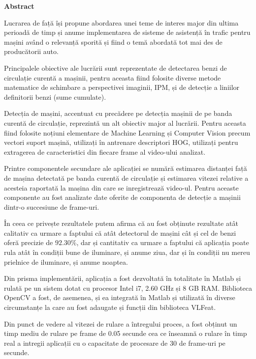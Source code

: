 \thispagestyle{plain}

\begin{center}
	\Large \textbf{Abstract}	
\end{center}

Lucrarea de față își propune abordarea unei teme de interes major din ultima perioadă de timp și anume implementarea de sisteme de asistență în trafic pentru mașini având o relevanță sporită și fiind o temă abordată tot mai des de producătorii auto. 

Principalele obiective ale lucrării sunt reprezentate de detectarea benzi de circulație curentă a mașinii, pentru aceasta fiind folosite diverse metode matematice de schimbare a perspectivei imaginii, IPM, și de detecție a liniilor definitorii benzi (sume cumulate).

Detecția de mașini, accentuat cu precădere pe detecția mașinii de pe banda curentă de circulație, reprezintă un alt obiectiv major al lucrării. Pentru aceasta fiind folosite noțiuni elementare de Machine Learning și Computer Vision precum vectori suport mașină, utilizați în antrenare descriptori HOG, utilizați pentru extragerea de caracteristici din fiecare frame al video-ului analizat.

Printre componentele secundare ale aplicației se numără estimarea distanței față de mașina detectată pe banda curentă de circulație și estimarea vitezei relative a acesteia raportată la mașina din care se inregistrează video-ul. Pentru aceaste componente au fost analizate date oferite de componenta de detecție a mașinii dintr-o succesiune de frame-uri.

În ceea ce privește rezultatele putem afirma că au fost obținute rezultate atât calitativ ca urmare a faptului că atât detectorul de mașini cât și cel de benzi oferă precizie de $92.30\%$, dar și cantitativ ca urmare a faptului că aplicația poate rula atât în condiții bune de iluminare, și anume ziua, dar și în condiții nu mereu prielnice de iluminare, și anume noaptea.

Din prisma implementării, aplicația a fost dezvoltată în totalitate în Matlab și rulată pe un sistem dotat cu procesor Intel i7, 2.60 GHz și 8 GB RAM. Biblioteca OpenCV a fost, de asemenea, și ea integrată în Matlab și utilizată în diverse circumstanțe la care au fost adaugate și funcții din biblioteca VLFeat.

Din punct de vedere al vitezei de rulare a întregului proces, a fost obținut un timp mediu de rulare pe frame de 0.05 secunde cea ce înseamnă o rulare în timp real a intregii aplicații cu o capacitate de procesare de 30 de frame-uri pe secunde.  
\vspace*{\fill}

